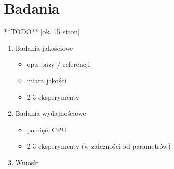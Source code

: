 \clearpage
\section{Badania}

**TODO** [ok. 15 stron]

\begin{enumerate}
    \item Badania jakościowe
    \begin{itemize}
        \item opis bazy / referencji
        \item miara jakości
        \item 2-3 eksperymenty
    \end{itemize}
    \item Badania wydajnościowe
    \begin{itemize}
        \item pamięć, CPU
        \item 2-3 eksperymenty  (w zależności od parametrów)
    \end{itemize}
    \item Wnioski
\end{enumerate}